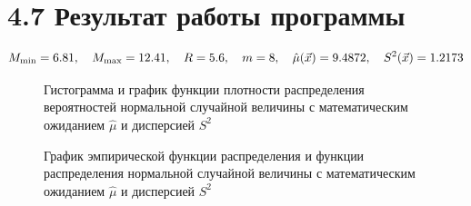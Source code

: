 \documentclass[12pt]{report}
\begin{document}
\clearpage

\section*{4.7 Результат работы программы}

\begin{equation*}
	M_{\min} = 6.81, \quad M_{\max} = 12.41, \quad R = 5.6, \quad m = 8, \quad \hat\mu(\vec x) = 9.4872, \quad S^2(\vec x) = 1.2173 \\
\end{equation*}

\begin{figure}[!h]
	\caption{Гистограмма и график функции плотности распределения вероятностей нормальной случайной величины с математическим ожиданием $\hat\mu$ и дисперсией $S^2$}
\end{figure}

\begin{figure}[!h]
	\caption{График эмпирической функции распределения и функции распределения нормальной случайной величины с математическим ожиданием $\hat\mu$ и дисперсией $S^2$}
\end{figure}
\end{document}
